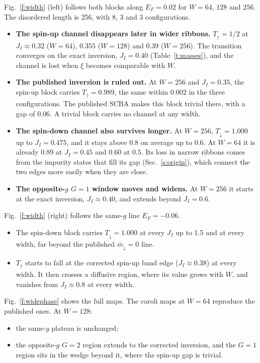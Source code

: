 \documentclass[11pt,a4paper]{article}
\newcommand{\up}{{\uparrow}}
\newcommand{\dn}{{\downarrow}}
\begin{document}
Fig.~\ref{f:width} (left) follows both blocks along $E_F=0.02$ for $W=64$, $128$ and $256$.
The disordered length is 256, with 8, 3 and 3 configurations.
\begin{itemize}
\item \textbf{The spin-up channel disappears later in wider ribbons.} $T_\up=1/2$ at
  $J_I\approx0.32$ ($W=64$), $0.355$ ($W=128$) and $0.39$ ($W=256$). The transition converges on
  the exact inversion, $J_I=0.40$ (Table~\ref{t:masses}), and the channel is lost when $\xi$
  becomes comparable with $W$.
\item \textbf{The published inversion is ruled out.} At $W=256$ and $J_I=0.35$, the spin-up block
  carries $T_\up=0.989$, the same within $0.002$ in the three configurations. The published SCBA
  makes this block trivial there, with a gap of $0.06$. A trivial block carries no channel at
  any width.
\item \textbf{The spin-down channel also survives longer.} At $W=256$, $T_\dn=1.000$ up to
  $J_I=0.475$, and it stays above $0.8$ on average up to $0.6$. At $W=64$ it is already $0.89$
  at $J_I=0.45$ and $0.60$ at $0.5$. Its loss in narrow ribbons comes from the impurity states
  that fill its gap (Sec.~\ref{s:origin}), which connect the two edges more easily when they
  are close.
\item \textbf{The opposite-$g$ $G=1$ window moves and widens.} At $W=256$ it starts at the exact
  inversion, $J_I\approx0.40$, and extends beyond $J_I=0.6$.
\end{itemize}
Fig.~\ref{f:width} (right) follows the same-$g$ line $E_F=-0.06$.
\begin{itemize}
\item The spin-down block carries $T_\dn=1.000$ at every $J_I$ up to 1.5 and at every width, far
  beyond the published $\bar m_\dn=0$ line.
\item $T_\up$ starts to fall at the corrected spin-up band edge ($J_I\approx0.38$) at every width.
  It then crosses a diffusive region, where its value grows with $W$, and vanishes from
  $J_I\approx0.8$ at every width.
\end{itemize}
Fig.~\ref{f:widephase} shows the full maps. The caroli maps at $W=64$ reproduce the published
ones. At $W=128$:
\begin{itemize}
\item the same-$g$ plateau is unchanged;
\item the opposite-$g$ $G=2$ region extends to the corrected inversion, and the $G=1$ region
  sits in the wedge beyond it, where the spin-up gap is trivial.
\end{itemize}
\end{document}

